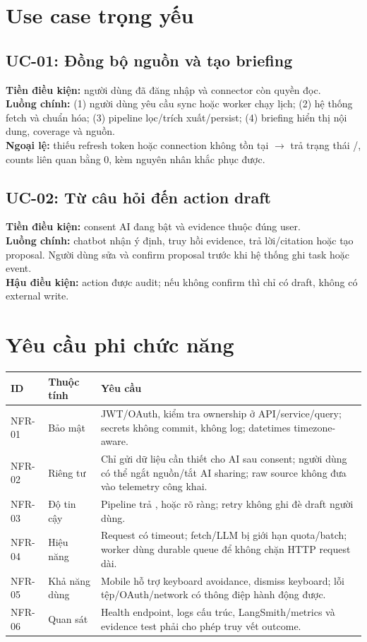 \documentclass[11pt,a4paper]{article}
\newcommand{\code}[1]{\texttt{\detokenize{#1}}}
\begin{document}
\section{Use case trọng yếu}
\subsection{UC-01: Đồng bộ nguồn và tạo briefing}
\textbf{Tiền điều kiện:} người dùng đã đăng nhập và connector còn quyền đọc.\\
\textbf{Luồng chính:} (1) người dùng yêu cầu sync hoặc worker chạy lịch; (2) hệ thống fetch và chuẩn hóa; (3) pipeline lọc/trích xuất/persist; (4) briefing hiển thị nội dung, coverage và nguồn.\\
\textbf{Ngoại lệ:} thiếu refresh token hoặc connection không tồn tại $\rightarrow$ trả trạng thái \code{blocked}/\code{failed}, counts liên quan bằng 0, kèm nguyên nhân khắc phục được.

\subsection{UC-02: Từ câu hỏi đến action draft}
\textbf{Tiền điều kiện:} consent AI đang bật và evidence thuộc đúng user.\\
\textbf{Luồng chính:} chatbot nhận ý định, truy hồi evidence, trả lời/citation hoặc tạo proposal. Người dùng sửa và confirm proposal trước khi hệ thống ghi task hoặc event.\\
\textbf{Hậu điều kiện:} action được audit; nếu không confirm thì chỉ có draft, không có external write.

\section{Yêu cầu phi chức năng}
\begin{longtable}{p{1.8cm}p{4cm}p{8.2cm}}
\toprule ID & Thuộc tính & Yêu cầu \\ \midrule\endhead
NFR-01 & Bảo mật & JWT/OAuth, kiểm tra ownership ở API/service/query; secrets không commit, không log; datetimes timezone-aware. \\
NFR-02 & Riêng tư & Chỉ gửi dữ liệu cần thiết cho AI sau consent; người dùng có thể ngắt nguồn/tắt AI sharing; raw source không đưa vào telemetry công khai. \\
NFR-03 & Độ tin cậy & Pipeline trả \code{completed}, \code{blocked} hoặc \code{failed} rõ ràng; retry không ghi đè draft người dùng. \\
NFR-04 & Hiệu năng & Request có timeout; fetch/LLM bị giới hạn quota/batch; worker dùng durable queue để không chặn HTTP request dài. \\
NFR-05 & Khả năng dùng & Mobile hỗ trợ keyboard avoidance, dismiss keyboard; lỗi tệp/OAuth/network có thông điệp hành động được. \\
NFR-06 & Quan sát & Health endpoint, logs cấu trúc, LangSmith/metrics và evidence test phải cho phép truy vết outcome. \\
\bottomrule
\end{longtable}
\end{document}
